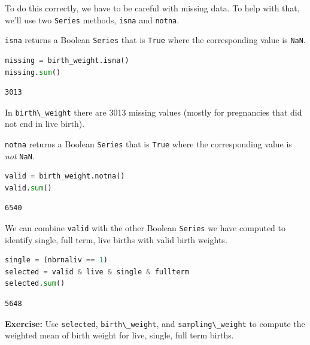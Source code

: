 To do this correctly, we have to be careful with missing data. To help
with that, we'll use two \passthrough{\lstinline!Series!} methods,
\passthrough{\lstinline!isna!} and \passthrough{\lstinline!notna!}.

\passthrough{\lstinline!isna!} returns a Boolean
\passthrough{\lstinline!Series!} that is \passthrough{\lstinline!True!}
where the corresponding value is \passthrough{\lstinline!NaN!}.

\begin{lstlisting}[language=Python,style=source]
missing = birth_weight.isna()
missing.sum()
\end{lstlisting}

\begin{lstlisting}[style=output]
3013
\end{lstlisting}

In \passthrough{\lstinline!birth\_weight!} there are 3013 missing values
(mostly for pregnancies that did not end in live birth).

\passthrough{\lstinline!notna!} returns a Boolean
\passthrough{\lstinline!Series!} that is \passthrough{\lstinline!True!}
where the corresponding value is \emph{not}
\passthrough{\lstinline!NaN!}.

\begin{lstlisting}[language=Python,style=source]
valid = birth_weight.notna()
valid.sum()
\end{lstlisting}

\begin{lstlisting}[style=output]
6540
\end{lstlisting}

We can combine \passthrough{\lstinline!valid!} with the other Boolean
\passthrough{\lstinline!Series!} we have computed to identify single,
full term, live births with valid birth weights.

\begin{lstlisting}[language=Python,style=source]
single = (nbrnaliv == 1)
selected = valid & live & single & fullterm
selected.sum()
\end{lstlisting}

\begin{lstlisting}[style=output]
5648
\end{lstlisting}

\textbf{Exercise:} Use \passthrough{\lstinline!selected!},
\passthrough{\lstinline!birth\_weight!}, and
\passthrough{\lstinline!sampling\_weight!} to compute the weighted mean
of birth weight for live, single, full term births.

